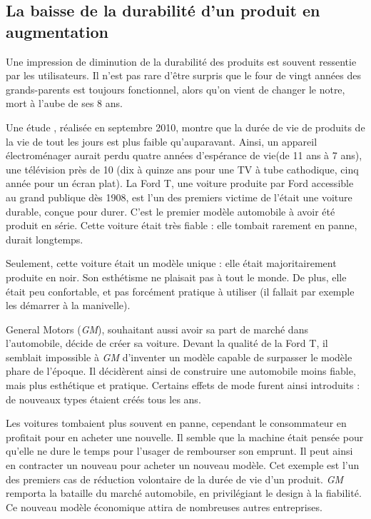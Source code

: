 \subsection{La baisse de la durabilité d'un produit en augmentation}

Une impression de diminution de la durabilité des produits est souvent ressentie par les utilisateurs.  Il n'est pas rare d'être surpris que le four de vingt années des grands-parents est toujours fonctionnel, alors qu'on vient de changer le notre, mort à l'aube de ses 8 ans. 

Une étude \cite{opSsg}, réalisée en septembre 2010, montre que la durée de vie de produits de la vie de tout les jours est plus faible qu'auparavant. Ainsi, un appareil électroménager aurait perdu quatre années d'espérance de vie(de 11 ans à 7 ans), une télévision près de 10 (dix à quinze ans pour une TV à tube cathodique, cinq année pour un écran plat). 
\smallbreak
La Ford T, une voiture produite par Ford accessible au grand publique dès 1908, est l'un des premiers victime de l'\op était une voiture durable, conçue pour durer.  C'est le premier modèle automobile à avoir été produit en série. Cette voiture était très fiable : elle tombait rarement en panne, durait longtemps. 

Seulement, cette voiture était un modèle unique : elle était majoritairement produite en noir. Son esthétisme ne plaisait pas à tout le monde. De plus, elle était peu confortable, et pas forcément pratique à utiliser (il fallait par exemple les démarrer à la manivelle).

General Motors (\textit{GM}), souhaitant aussi avoir sa part de marché dans l'automobile, décide de créer sa voiture. Devant la qualité de la Ford T, il semblait impossible à \textit{GM} d'inventer un modèle capable de surpasser le modèle phare de l'époque. Il décidèrent ainsi de construire une automobile moins fiable, mais plus esthétique et pratique. Certains effets de mode furent ainsi introduits : de nouveaux types étaient créés tous les ans.

 Les voitures tombaient plus souvent en panne, cependant le consommateur en profitait pour en acheter une nouvelle. Il semble que la machine était pensée pour qu'elle ne dure le temps pour l'usager de rembourser son emprunt. Il peut ainsi en contracter un nouveau pour acheter un nouveau modèle.  
\smallbreak
Cet exemple est l'un des premiers cas de réduction volontaire de la durée de vie d'un produit. \textit{GM} remporta la bataille du marché automobile, en privilégiant le design à la fiabilité. Ce nouveau modèle économique attira de nombreuses autres entreprises. 

